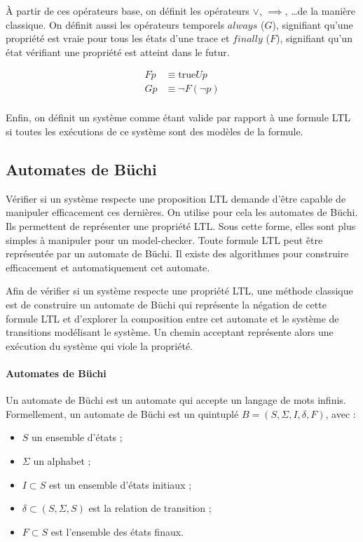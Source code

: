 À partir de ces opérateurs base, on définit les opérateurs \(\lor\),
\(\implies\), \dots de la manière classique. On définit aussi les
opérateurs temporels \(always\) (\(G\)), signifiant qu'une propriété est
vraie pour tous les états d'une trace et \(finally\) (\(F\)), signifiant
qu'un état vérifiant une propriété est atteint dans le futur.

\[
\begin{aligned}
F p & \equiv \text{true} U p \\
G p & \equiv \lnot F (\lnot p)\\
\end{aligned}
\]

Enfin, on définit un système comme étant valide par rapport à une
formule \ac{LTL} si toutes les exécutions de ce système sont des modèles de
la formule.

\subsection{Automates de Büchi}

Vérifier si un système respecte une proposition \ac{LTL} demande d'être capable de
manipuler efficacement ces dernières. On utilise pour cela les automates de
Büchi. Ils permettent de représenter une propriété \ac{LTL}. Sous cette forme, elles
sont plus simples à manipuler pour un model-checker. Toute formule \ac{LTL} peut être
représentée par un automate de Büchi. Il existe des algorithmes pour construire
efficacement et automatiquement cet automate\citep{ltl2ba}.

Afin de vérifier si un système respecte une propriété \ac{LTL}, une méthode classique
est de construire un automate de Büchi qui représente la négation de cette
formule \ac{LTL} et d'explorer la composition entre cet automate et le système de
transitions modélisant le système. Un chemin acceptant représente alors une
exécution du système qui viole la propriété.

\paragraph{Automates de Büchi}
Un automate de Büchi est un automate qui accepte un langage de mots
infinis. Formellement, un automate de Büchi est un quintuplé
\(B = (S, \Sigma, I, \delta, F)\), avec :

\begin{itemize}
\item
  \(S\) un ensemble d'états ;
\item
  \(\Sigma\) un alphabet ;
\item
  \(I \subset S\) est un ensemble d'états initiaux ;
\item
  \(\delta \subset (S, \Sigma, S)\) est la relation de transition ;
\item
  \(F \subset S\) est l'ensemble des états finaux.
\end{itemize}

